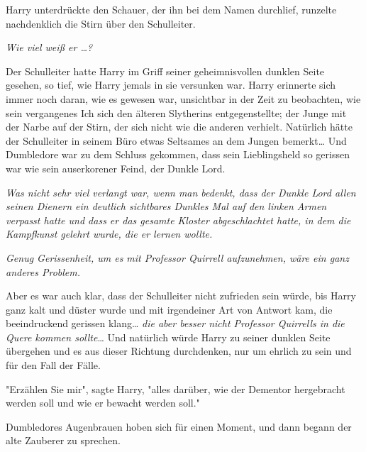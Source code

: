 {Harry unterdrückte den Schauer, der ihn bei dem Namen durchlief, runzelte nachdenklich die Stirn über den Schulleiter.

\emph{Wie viel weiß er …?}

Der Schulleiter hatte Harry im Griff seiner geheimnisvollen dunklen Seite gesehen, so tief, wie Harry jemals in sie versunken war. Harry erinnerte sich immer noch daran, wie es gewesen war, unsichtbar in der Zeit zu beobachten, wie sein vergangenes Ich sich den älteren Slytherins entgegenstellte; der Junge mit der Narbe auf der Stirn, der sich nicht wie die anderen verhielt. Natürlich hätte der Schulleiter in seinem Büro etwas Seltsames an dem Jungen bemerkt… Und Dumbledore war zu dem Schluss gekommen, dass sein Lieblingsheld so gerissen war wie sein auserkorener Feind, der Dunkle Lord.

\emph{Was nicht sehr viel verlangt war, wenn man bedenkt, dass der Dunkle Lord allen seinen Dienern ein deutlich sichtbares Dunkles Mal auf den linken Armen verpasst hatte und dass er das gesamte Kloster abgeschlachtet hatte, in dem die Kampfkunst gelehrt wurde, die er lernen wollte.}

\emph{Genug Gerissenheit, um es mit Professor Quirrell aufzunehmen, wäre ein ganz anderes Problem.}

Aber es war auch klar, dass der Schulleiter nicht zufrieden sein würde, bis Harry ganz kalt und düster wurde und mit irgendeiner Art von Antwort kam, die beeindruckend gerissen klang… \emph{die aber besser nicht Professor Quirrells in die Quere kommen sollte}… Und natürlich würde Harry zu seiner dunklen Seite übergehen und es aus dieser Richtung durchdenken, nur um ehrlich zu sein und für den Fall der Fälle.

"Erzählen Sie mir", sagte Harry, "alles darüber, wie der Dementor hergebracht werden soll und wie er bewacht werden soll."

Dumbledores Augenbrauen hoben sich für einen Moment, und dann begann der alte Zauberer zu sprechen.

}
